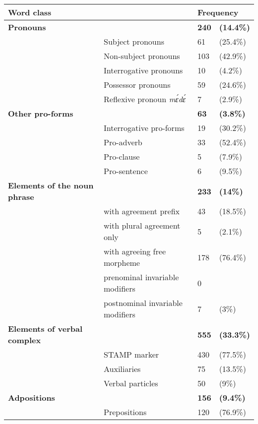 \begin{table} 
\centering
\small
\begin{tabular}{ll|ll}
 \midrule
  \multicolumn{2}{l}{Word class} &  \multicolumn{2}{l}{Frequency}  \\ %
 \midrule
 {\bfseries Pronouns}  &  & {\bfseries 240} & {\bfseries (14.4\%)} \\ 
  & Subject pronouns  &   61 &    (25.4\%) \\ %
  & Non-subject pronouns  &   103 &   (42.9\%) \\ %
  & Interrogative pronouns  &    10 &   (4.2\%) \\
  & Possessor pronouns  &   59 &   (24.6\%) \\
  & Reflexive pronoun {\itshape mɛ́dɛ́}  &   7 &   (2.9\%) \\
 {\bfseries Other pro-forms} &   & {\bfseries 63} & {\bfseries (3.8\%)} \\
  & Interrogative pro-forms  &   19  &   (30.2\%) \\ %
  & Pro-adverb &   33 &   (52.4\%) \\
  & Pro-clause &    5 &   (7.9\%) \\
  & Pro-sentence &   6 &   (9.5\%) \\
 {\bfseries Elements of the noun phrase} &  & {\bfseries 233} & {\bfseries (14\%)} \\
 & with agreement prefix  &    43 &   (18.5\%) \\
 & with plural agreement only  &   5  &   (2.1\%) \\
 & with agreeing free morpheme  &   178 &    (76.4\%) \\ 
 & prenominal invariable modifiers  &   0 &    \\
 & postnominal invariable modifiers   &   7 &   (3\%) \\
 {\bfseries Elements of verbal complex} &  & {\bfseries 555} & {\bfseries (33.3\%)} \\
  & STAMP marker  &   430 &   (77.5\%) \\
 & Auxiliaries   &   75  &   (13.5\%) \\ %
 & Verbal particles   &   50 &   (9\%) \\
 {\bfseries Adpositions} &  & {\bfseries 156} & {\bfseries (9.4\%)} \\
 & Prepositions  &   120  &   (76.9\%) \\

\end{tabular}
\end{table}

